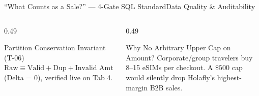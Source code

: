 \documentclass[aspectratio=169,8pt]{beamer}
\newcommand{\code}[1]{{\fontfamily{pcr}\selectfont\fontsize{6.5}{8.0}\selectfont\color{ink}#1}}
\begin{document}
\begin{frame}[t]{``What Counts as a Sale?'' --- 4-Gate SQL Standard}{Data Quality \& Auditability}
\vspace{3pt}
\begin{columns}[T,onlytextwidth]
  \begin{column}{0.49\textwidth}
    \begin{neutralcard}{Partition Conservation Invariant (T-06)}
      {\fontsize{6.2}{7.7}\selectfont $\text{Raw} \equiv \text{Valid} + \text{Dup} + \text{Invalid Amt} + \text{QA Email} + \text{Missing Dim}$ (\code{Delta = 0}), verified live on Tab 4.}
    \end{neutralcard}
  \end{column}
  \begin{column}{0.49\textwidth}
    \begin{neutralcard}{Why No Arbitrary Upper Cap on Amount?}
      {\fontsize{6.2}{7.7}\selectfont Corporate/group travelers buy 8--15 eSIMs per checkout. A $\$500$ cap would silently drop Holafly's highest-margin B2B sales.}
    \end{neutralcard}
  \end{column}
\end{columns}
\end{frame}
\end{document}
